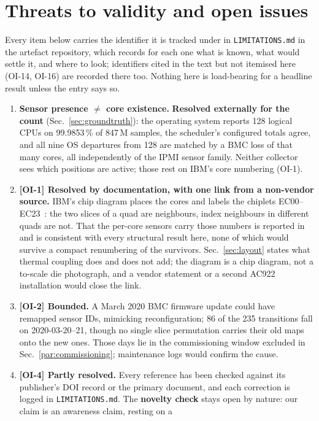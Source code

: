 \documentclass[10pt,conference]{IEEEtran}
\begin{document}
\section{Threats to validity and open issues}
\label{sec:threats}
Every item below carries the identifier it is tracked under in \texttt{LIMITATIONS.md} in the
artefact repository, which records for each one what is known, what would settle it, and where to
look; identifiers cited in the text but not itemised here (OI-14, OI-16) are recorded there too.
Nothing here is load-bearing for a headline result unless the entry says so.

\begin{enumerate}
\item \textbf{Sensor presence $\ne$ core existence.} \textbf{Resolved externally for the count}
(Sec.~\ref{sec:groundtruth}): the operating system reports 128 logical CPUs on 99.9853\,\% of
847\,M samples, the scheduler's configured totals agree, and all nine OS departures from 128 are
matched by a BMC loss of that many cores, all independently of the IPMI sensor family. Neither
collector sees which positions are active; those rest on IBM's core numbering (OI-1).
\item \textbf{[OI-1] Resolved by documentation, with one link from a non-vendor source.} IBM's
chip diagram places the cores and labels the chiplets EC00--EC23~\cite[Fig.~2]{ibm_p9regs}: the two
slices of a quad are neighbours, index neighbours in different quads are not. That the per-core
sensors carry those numbers is reported in~\cite{smith2020p9layout} and is consistent with every
structural result here, none of which would survive a compact renumbering of the survivors.
Sec.~\ref{sec:layout} states what thermal coupling does and does not add; the diagram is a chip
diagram, not a to-scale die photograph, and a vendor statement or a second AC922 installation would
close the link.
\item \textbf{[OI-2] Bounded.} A March 2020 BMC firmware update could have remapped sensor IDs,
mimicking reconfiguration; 86 of the 235 transitions fall on 2020-03-20--21, though no single
slice permutation carries their old maps onto the new ones. Those days lie in the commissioning
window excluded in Sec.~\ref{par:commissioning}; maintenance logs would confirm the cause.
\item \textbf{[OI-4] Partly resolved.} Every reference has been checked against its publisher's
DOI record or the primary document, and each correction is logged in \texttt{LIMITATIONS.md}.
The \textbf{novelty check} stays open by nature: our claim is an awareness claim, resting on a

\end{enumerate}
\end{document}
